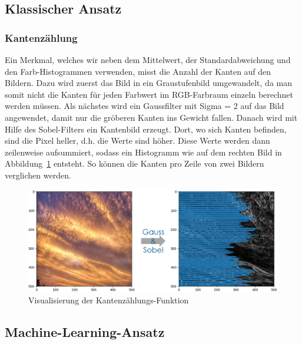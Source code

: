 \documentclass[a4,german]{article}
\begin{document}
\subsection{Klassischer Ansatz}


\subsubsection{Kantenzählung}
\label{sec:kanten}
Ein Merkmal, welches wir neben dem Mittelwert, der Standardabweichung und den Farb-Histogrammen verwenden, misst die Anzahl der Kanten auf den Bildern.
Dazu wird zuerst das Bild in ein Graustufenbild umgewandelt, da man somit nicht die Kanten für jeden Farbwert im RGB-Farbraum einzeln berechnet werden müssen. Als nächstes wird ein Gaussfilter mit Sigma = 2 auf das Bild angewendet, damit nur die gröberen Kanten ins Gewicht fallen. Danach wird mit Hilfe des Sobel-Filters ein Kantenbild erzeugt.
Dort, wo sich Kanten befinden, sind die Pixel heller, d.h. die Werte sind höher.
Diese Werte werden dann zeilenweise aufsummiert, sodass ein Histogramm wie auf dem rechten Bild in Abbildung~\ref{fig:kaz} entsteht. So können die Kanten pro Zeile von zwei Bildern verglichen werden.

\begin{figure}[h!]
\centering
\includegraphics[width=\textwidth]{Kantenzaehlung.png}
\caption{Visualisierung der Kantenzählungs-Funktion}
    \label{fig:kaz}
\end{figure}


\subsection{Machine-Learning-Ansatz}
\end{document}
